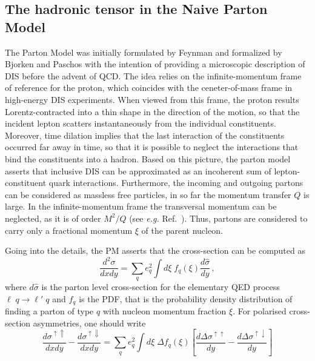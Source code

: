 \subsection{The hadronic tensor in the Naive Parton Model}
\label{subsec:PM_hadronic_tensor}
The Parton Model was initially formulated by Feynman \cite{PhysRevLett.23.1415} and formalized by Bjorken and Paschos \cite{PhysRev.185.1975} with the intention of providing a microscopic description of DIS before the advent of QCD. The idea relies on the infinite-momentum frame of reference for the proton, which coincides with the ceneter-of-mass frame in high-energy DIS experiments. When viewed from this frame, the proton results Lorentz-contracted into a thin shape in the direction of the motion, so that the incident lepton scatters instantaneously from the individual constituents. Moreover, time dilation implies that the last interaction of the constituents occurred far away in time, so that it is possible to neglect the interactions that bind the constituents into a hadron. Based on this picture, the parton model asserts that inclusive DIS can be approximated as an incoherent sum of lepton-constituent quark interactions. Furthermore, the incoming and outgoing partons can be considered as massless free particles, in so far the momentum transfer $Q$ is large. In the infinite-momentum frame the transversal momentum can be neglected, as it is of order $M^2/Q$ (see \textit{e.g.} Ref.~\cite{collins_2011}). Thus, partons are considered to carry only a fractional momentum $\xi$ of the parent nucleon.\par
Going into the details, the PM asserts that the cross-section can be computed as
\begin{equation}
  \frac{d^2 \sigma}{dx dy} = \sum_{q} e_q^2 \int d\xi \;f_q (\xi) \frac{d \hat{\sigma}}{dy}\,,
  \label{eq:PM_CS}
\end{equation}
where $d \hat{\sigma}$ is the parton level cross-section for the elementary QED process $\ell \; q \rightarrow \ell' \; q$ and $f_q$ is the PDF, that is the probability density distribution of finding a parton of type $q$ with nucleon momentum fraction $\xi$. For polarised cross-section asymmetries, one should write
\begin{equation}
  \frac{d \sigma^{\uparrow \Uparrow}}{dx dy} - \frac{d \sigma^{\uparrow \Downarrow}}{dx dy} = \sum_{q} e_q^2 \int d\xi \; \Delta f_q (\xi) \left[ \frac{d \Delta \sigma^{\uparrow \uparrow}}{dy} - \frac{d \Delta \sigma^{\uparrow \downarrow}}{dy} \right]
  \label{eq:PM_fact}
\end{equation}
